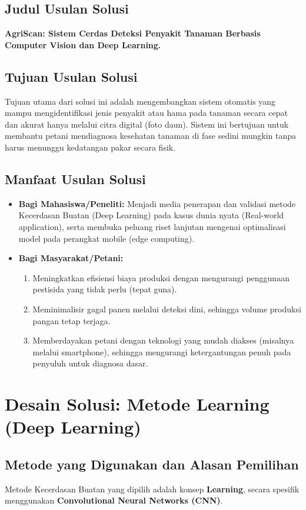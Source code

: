 \documentclass[a4paper,12pt]{article}
\begin{document}
\subsection{Judul Usulan Solusi}
\textbf{AgriScan: Sistem Cerdas Deteksi Penyakit Tanaman Berbasis Computer Vision dan Deep Learning.}

\subsection{Tujuan Usulan Solusi}
Tujuan utama dari solusi ini adalah mengembangkan sistem otomatis yang mampu mengidentifikasi jenis penyakit atau hama pada tanaman secara cepat dan akurat hanya melalui citra digital (foto daun). Sistem ini bertujuan untuk membantu petani mendiagnosa kesehatan tanaman di fase sedini mungkin tanpa harus menunggu kedatangan pakar secara fisik.

\subsection{Manfaat Usulan Solusi}
\begin{itemize}
    \item \textbf{Bagi Mahasiswa/Peneliti:} Menjadi media penerapan dan validasi metode Kecerdasan Buatan (Deep Learning) pada kasus dunia nyata (Real-world application), serta membuka peluang riset lanjutan mengenai optimalisasi model pada perangkat mobile (edge computing).
    \item \textbf{Bagi Masyarakat/Petani:}
    \begin{enumerate}
        \item Meningkatkan efisiensi biaya produksi dengan mengurangi penggunaan pestisida yang tidak perlu (tepat guna).
        \item Meminimalisir gagal panen melalui deteksi dini, sehingga volume produksi pangan tetap terjaga.
        \item Memberdayakan petani dengan teknologi yang mudah diakses (misalnya melalui smartphone), sehingga mengurangi ketergantungan penuh pada penyuluh untuk diagnosa dasar.
    \end{enumerate}
\end{itemize}

\section{Desain Solusi: Metode Learning (Deep Learning)}

\subsection{Metode yang Digunakan dan Alasan Pemilihan}
Metode Kecerdasan Buatan yang dipilih adalah konsep \textbf{Learning}, secara spesifik menggunakan \textbf{Convolutional Neural Networks (CNN)}.
\end{document}
